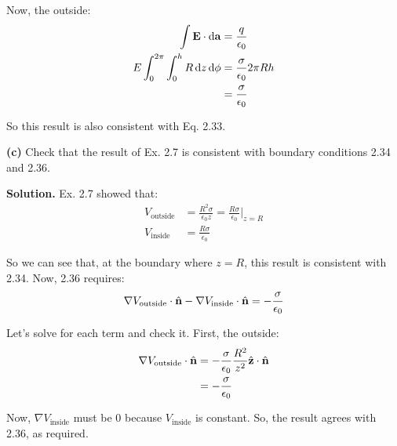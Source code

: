 \documentclass{article}
\begin{document}
Now, the outside:
\begin{equation*}
\begin{aligned}
\int \vb{E}\cdot \dd \vb{a} &= \frac{q}{\epsilon_0} \\
E\int_0^{2\pi}\int_0^h R\dd{z}\dd{\phi} &= \frac{\sigma}{\epsilon_0}2\pi Rh \\
&= \frac{\sigma}{\epsilon_0}
\end{aligned}
\end{equation*}

So this result is also consistent with Eq. 2.33.

\textbf{(c)} Check that the result of Ex. 2.7 is consistent with boundary conditions 2.34 and 2.36.

\textbf{Solution.} Ex. 2.7 showed that:
\begin{equation*}
\begin{aligned}
V_\text{outside} &= \frac{R^2\sigma}{\epsilon_0z} = \frac{R\sigma}{\epsilon_0}\Bigg|_{z = R} \\
V_\text{inside} &= \frac{R\sigma}{\epsilon_0}
\end{aligned}
\end{equation*}

So we can see that, at the boundary where $z = R$, this result is consistent with 2.34. Now, 2.36 requires:
\begin{equation*}
\nabla V_\text{outside}\cdot\hat{\vb{n}} - \nabla V_\text{inside}\cdot\hat{\vb{n}} = -\frac{\sigma}{\epsilon_0}
\end{equation*}

Let's solve for each term and check it. First, the outside:
\begin{equation}
\begin{aligned}
\nabla V_\text{outside}\cdot\hat{\vb{n}} &= -\frac{\sigma}{\epsilon_0}\frac{R^2}{z^2}\hat{\vb{z}}\cdot\hat{\vb{n}} \\
&= -\frac{\sigma}{\epsilon_0}
\end{aligned}
\end{equation}

Now, $\nabla V_\text{inside}$ must be 0 because $V_\text{inside}$ is constant. So, the result agrees with 2.36, as required.
\end{document}
